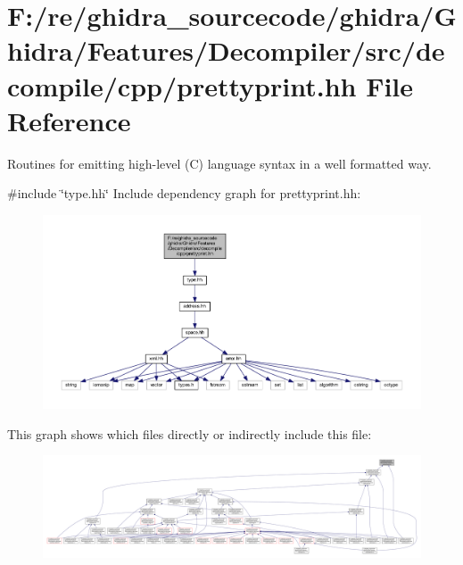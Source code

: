 \hypertarget{prettyprint_8hh}{}\section{F\+:/re/ghidra\+\_\+sourcecode/ghidra/\+Ghidra/\+Features/\+Decompiler/src/decompile/cpp/prettyprint.hh File Reference}
\label{prettyprint_8hh}


Routines for emitting high-\/level (C) language syntax in a well formatted way.  


{\ttfamily \#include \char`\"{}type.\+hh\char`\"{}}\newline
Include dependency graph for prettyprint.\+hh\+:
\nopagebreak
\begin{figure}[H]
\begin{center}
\leavevmode
\includegraphics[width=350pt]{prettyprint_8hh__incl}
\end{center}
\end{figure}
This graph shows which files directly or indirectly include this file\+:
\nopagebreak
\begin{figure}[H]
\begin{center}
\leavevmode
\includegraphics[width=350pt]{prettyprint_8hh__dep__incl}
\end{center}
\end{figure}
